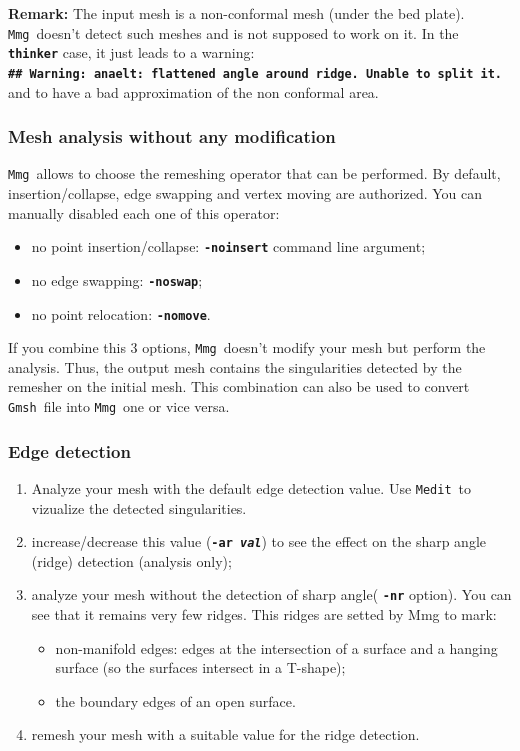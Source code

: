 \documentclass{article}
\newcommand{\ttb}[1]{\texttt{\textbf{#1}}}
\newcommand{\mmg}{\texttt{Mmg}}
\newcommand{\medit}{\texttt{Medit}}
\newcommand{\gmsh}{\texttt{Gmsh}}
\begin{document}
\textbf{Remark: } The input mesh is a non-conformal mesh (under the
bed plate). \mmg\ doesn't detect such meshes and is not supposed to work on it.
In the \ttb{thinker} case, it just leads to a warning:\\
\ttb{\#\# Warning: anaelt: flattened angle around ridge. Unable to split it.\\}
 and to have a bad approximation of the non conformal area.

\subsubsection{Mesh analysis without any modification}
\mmg\ allows to choose the remeshing operator that can be performed. By
default, insertion/collapse, edge swapping and vertex moving are
authorized. You can manually disabled each one of this operator:
\begin{itemize}
\item no point insertion/collapse: \ttb{-noinsert} command line argument;
\item no edge swapping: \ttb{-noswap};
\item no point relocation: \ttb{-nomove}.
\end{itemize}

If you combine this 3 options, \mmg\ doesn't modify your mesh but
perform the analysis. Thus, the output mesh contains the singularities
detected by the remesher on the initial mesh. This combination can
also be used to convert \gmsh\ file into \mmg\ one or vice versa.


\subsubsection{Edge detection}
\begin{enumerate}
\item Analyze your mesh with the default edge detection value. Use
  \medit\ to vizualize the detected singularities.
\item increase/decrease this value (\ttb{-ar \textit{val}}) to see the
  effect on the sharp angle (ridge) detection (analysis only);
\item analyze your mesh without the detection of sharp angle( \ttb{-nr} option).
You can see that it remains very few ridges. This ridges are setted by Mmg to mark:
\begin{itemize}
\item non-manifold edges: edges at the intersection of a surface and
  a hanging surface (so the surfaces intersect in a T-shape);
\item the boundary edges of an open surface.
\end{itemize}
\item remesh your mesh with a suitable value for the ridge detection.
\end{enumerate}
\end{document}
